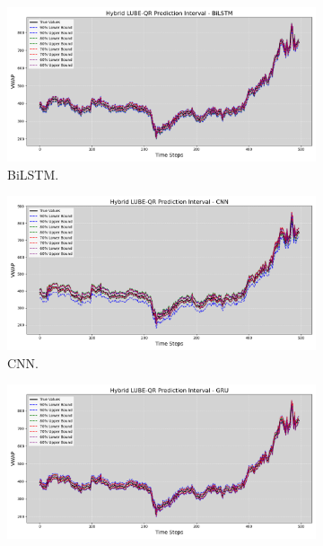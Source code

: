 \begin{figure}[H]
    \centering
    \begin{minipage}{0.49\textwidth}
        \centering
        \begin{subfigure}[b]{\textwidth}
            \centering
            \includegraphics[width=\textwidth]{Chap03/figs/AP_Hybrid_LUBE_QR_AllConfidence_BiLSTM.png}
            \caption{BiLSTM.}
        \end{subfigure}
        \hfill
        \begin{subfigure}[b]{\textwidth}
            \centering
            \includegraphics[width=\textwidth]{Chap03/figs/AP_Hybrid_LUBE_QR_AllConfidence_CNN.png}
            \caption{CNN.}
        \end{subfigure}
        \begin{subfigure}[b]{\textwidth}
            \centering
            \includegraphics[width=\textwidth]{Chap03/figs/AP_Hybrid_LUBE_QR_AllConfidence_GRU.png}

\end{subfigure}
\end{minipage}
\end{figure}
